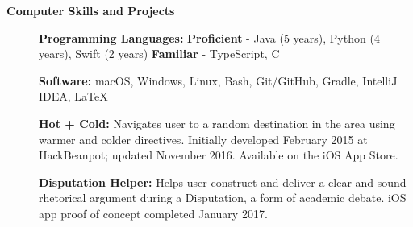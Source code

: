 \documentclass[letterpaper,10.6pt]{article}
\newcommand{\resheading}[1]{{\large \colorbox{mygrey}{\begin{minipage}{\textwidth}{\textbf{#1 \vphantom{p\^{E}}}}\end{minipage}}}}
\begin{document}
\resheading{Computer Skills and Projects}
{\small
\begin{description}
	\item[] \hspace{0.03in} \textbf{Programming Languages:} {\footnotesize \textbf{Proficient} - Java (5 years), Python (4 years), Swift (2 years) \enspace \textbf{Familiar} - TypeScript, C}
	\item[] \hspace{0.03in} \textbf{Software:} {\footnotesize macOS, Windows, Linux, Bash, Git/GitHub, Gradle, IntelliJ IDEA, \LaTeX}
	\item[] \hspace{0.03in} \textbf{Hot + Cold:} {\footnotesize Navigates user to a random destination in the area using warmer and colder directives. Initially developed February 2015 at HackBeanpot; updated November 2016. Available on the iOS App Store.}
	\item[] \hspace{0.03in} \textbf{Disputation Helper:} {\footnotesize Helps user construct and deliver a clear and sound rhetorical argument during a Disputation, a form of academic debate. iOS app proof of concept completed January 2017.}
	
\end{description}}
\end{document}
